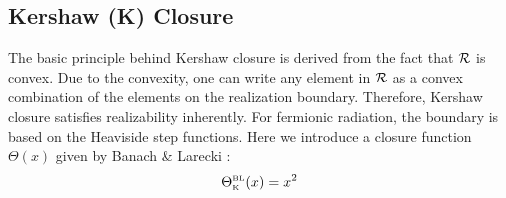 \subsection{Kershaw (K) Closure}

The basic principle behind Kershaw closure is derived from the fact that $\mathcal{R}$ is convex.
Due to the convexity, one can write any element in $\mathcal{R}$ as a convex combination of the elements on the realization boundary. 
Therefore, Kershaw closure satisfies realizability inherently.
For fermionic radiation, the boundary is based on the Heaviside step functions.
Here we introduce a closure function $\Theta(x)$ given by Banach \& Larecki \cite{banachLarecki_2017a}:
\begin{equation}
  \Theta_{\mbox{\tiny K}}^{\mbox{\tiny BL}}(x)=x^{2}
\end{equation}

